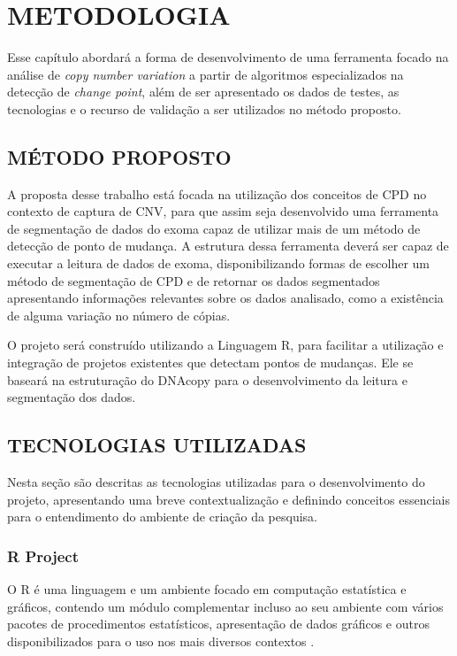 
\chapter{METODOLOGIA}
\label{chap:metodologia}
Esse capítulo abordará a forma de desenvolvimento de uma ferramenta focado na análise de \textit{copy number variation} a partir de algoritmos especializados na detecção de \textit{change point}, além de ser apresentado os dados de testes, as tecnologias e o recurso de validação a ser utilizados no método proposto.

\section{MÉTODO PROPOSTO}

A proposta desse trabalho está focada na utilização dos conceitos de CPD no contexto de captura de CNV, para que assim seja desenvolvido uma ferramenta de segmentação de dados do exoma capaz de utilizar mais de um método de detecção de ponto de mudança. A estrutura dessa ferramenta deverá ser capaz de executar a leitura de dados de exoma, disponibilizando formas de escolher um método de segmentação de CPD e de retornar os dados segmentados apresentando informações relevantes sobre os dados analisado, como a existência de alguma variação no número de cópias.

O projeto será construído utilizando a Linguagem R, para facilitar a utilização e integração de projetos existentes que detectam pontos de mudanças. Ele se baseará na estruturação do DNAcopy \cite{Olshen2004} para o desenvolvimento da leitura e segmentação dos dados.

\section{TECNOLOGIAS UTILIZADAS}

Nesta seção são descritas as tecnologias utilizadas para o desenvolvimento do projeto, apresentando uma breve contextualização e definindo conceitos essenciais para o entendimento do ambiente de criação da pesquisa.

\subsection{R Project}

O R \cite{Core2019} é uma linguagem e um ambiente focado em computação estatística e gráficos, contendo um módulo complementar incluso ao seu ambiente com vários pacotes de procedimentos estatísticos, apresentação de dados gráficos e outros disponibilizados para o uso nos mais diversos contextos \cite{website:Hornik2018}.

